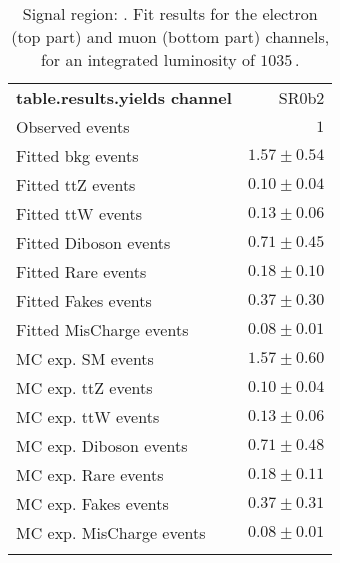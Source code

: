 

\begin{table}
\begin{center}
\setlength{\tabcolsep}{0.0pc}
{\small
\begin{tabular*}{\textwidth}{@{\extracolsep{\fill}}lr}
\noalign{\smallskip}\hline\noalign{\smallskip}
{\bf table.results.yields channel}           & SR0b2              \\[-0.05cm]
\noalign{\smallskip}\hline\noalign{\smallskip}
Observed events          & $1$                    \\
\noalign{\smallskip}\hline\noalign{\smallskip}
Fitted bkg events         & $1.57 \pm 0.54$              \\
\noalign{\smallskip}\hline\noalign{\smallskip}
        Fitted ttZ events         & $0.10 \pm 0.04$              \\
        Fitted ttW events         & $0.13 \pm 0.06$              \\
        Fitted Diboson events         & $0.71 \pm 0.45$              \\
        Fitted Rare events         & $0.18 \pm 0.10$              \\
        Fitted Fakes events         & $0.37 \pm 0.30$              \\
        Fitted MisCharge events         & $0.08 \pm 0.01$              \\
 \noalign{\smallskip}\hline\noalign{\smallskip}
MC exp. SM events              & $1.57 \pm 0.60$              \\
\noalign{\smallskip}\hline\noalign{\smallskip}
        MC exp. ttZ events         & $0.10 \pm 0.04$              \\
        MC exp. ttW events         & $0.13 \pm 0.06$              \\
        MC exp. Diboson events         & $0.71 \pm 0.48$              \\
        MC exp. Rare events         & $0.18 \pm 0.11$              \\
        MC exp. Fakes events         & $0.37 \pm 0.31$              \\
        MC exp. MisCharge events         & $0.08 \pm 0.01$              \\
\noalign{\smallskip}\hline\noalign{\smallskip}
\end{tabular*}
}
\end{center}
\caption{Signal region: . Fit results for the electron (top part) and muon (bottom part) channels, for an integrated luminosity of $1035$\,\ipb.
}
\end{table}
